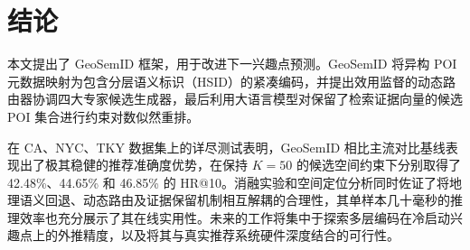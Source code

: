 \documentclass[10pt,fontset=none,twocolumn]{ctexart}
\begin{document}
\section{结论}
\label{sec:conclusion}

本文提出了 GeoSemID 框架，用于改进下一兴趣点预测。GeoSemID 将异构 POI 元数据映射为包含分层语义标识（HSID）的紧凑编码，并提出效用监督的动态路由器协调四大专家候选生成器，最后利用大语言模型对保留了检索证据向量的候选 POI 集合进行约束对数似然重排。

在 CA、NYC、TKY 数据集上的详尽测试表明，GeoSemID 相比主流对比基线表现出了极其稳健的推荐准确度优势，在保持 $K=50$ 的候选空间约束下分别取得了 42.48\%、44.65\% 和 46.85\% 的 HR@10。消融实验和空间定位分析同时佐证了将地理语义回退、动态路由及证据保留机制相互解耦的合理性，其单样本几十毫秒的推理效率也充分展示了其在线实用性。未来的工作将集中于探索多层编码在冷启动兴趣点上的外推精度，以及将其与真实推荐系统硬件深度结合的可行性。



\end{document}
